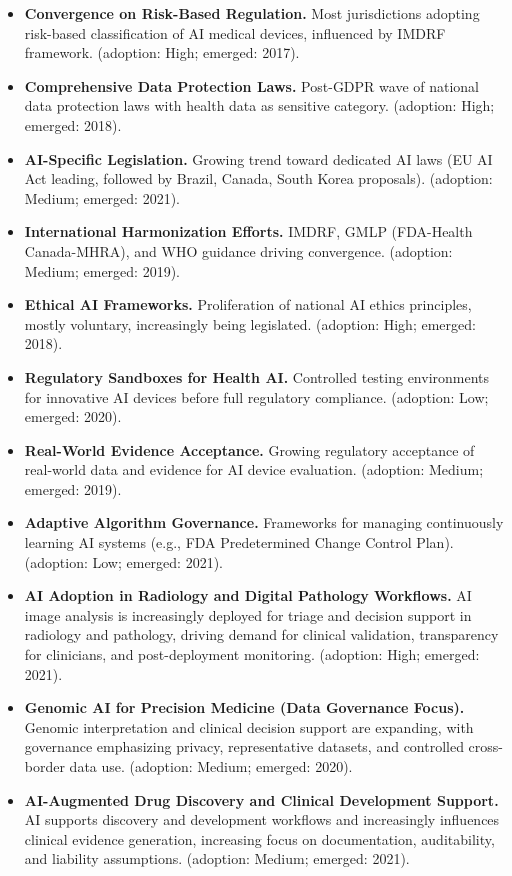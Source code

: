 \begin{itemize}[noitemsep]
  \item \textbf{Convergence on Risk-Based Regulation.} Most jurisdictions adopting risk-based classification of AI medical devices, influenced by IMDRF framework. (adoption: High; emerged: 2017).
  \item \textbf{Comprehensive Data Protection Laws.} Post-GDPR wave of national data protection laws with health data as sensitive category. (adoption: High; emerged: 2018).
  \item \textbf{AI-Specific Legislation.} Growing trend toward dedicated AI laws (EU AI Act leading, followed by Brazil, Canada, South Korea proposals). (adoption: Medium; emerged: 2021).
  \item \textbf{International Harmonization Efforts.} IMDRF, GMLP (FDA-Health Canada-MHRA), and WHO guidance driving convergence. (adoption: Medium; emerged: 2019).
  \item \textbf{Ethical AI Frameworks.} Proliferation of national AI ethics principles, mostly voluntary, increasingly being legislated. (adoption: High; emerged: 2018).
  \item \textbf{Regulatory Sandboxes for Health AI.} Controlled testing environments for innovative AI devices before full regulatory compliance. (adoption: Low; emerged: 2020).
  \item \textbf{Real-World Evidence Acceptance.} Growing regulatory acceptance of real-world data and evidence for AI device evaluation. (adoption: Medium; emerged: 2019).
  \item \textbf{Adaptive Algorithm Governance.} Frameworks for managing continuously learning AI systems (e.g., FDA Predetermined Change Control Plan). (adoption: Low; emerged: 2021).
  \item \textbf{AI Adoption in Radiology and Digital Pathology Workflows.} AI image analysis is increasingly deployed for triage and decision support in radiology and pathology, driving demand for clinical validation, transparency for clinicians, and post-deployment monitoring. (adoption: High; emerged: 2021).
  \item \textbf{Genomic AI for Precision Medicine (Data Governance Focus).} Genomic interpretation and clinical decision support are expanding, with governance emphasizing privacy, representative datasets, and controlled cross-border data use. (adoption: Medium; emerged: 2020).
  \item \textbf{AI-Augmented Drug Discovery and Clinical Development Support.} AI supports discovery and development workflows and increasingly influences clinical evidence generation, increasing focus on documentation, auditability, and liability assumptions. (adoption: Medium; emerged: 2021).

\end{itemize}
